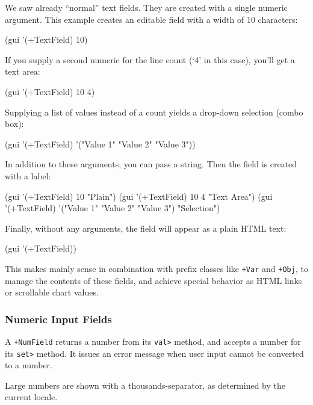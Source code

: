 We saw already ``normal'' text fields. They are created with a single
numeric argument. This example creates an editable field with a width of
10 characters:


\begin{wideverbatim}
(gui '(+TextField) 10)
\end{wideverbatim}

If you supply a second numeric for the line count (`4' in this case),
you'll get a text area:


\begin{wideverbatim}
(gui '(+TextField) 10 4)
\end{wideverbatim}

Supplying a list of values instead of a count yields a drop-down
selection (combo box):


\begin{wideverbatim}
(gui '(+TextField) '("Value 1" "Value 2" "Value 3"))
\end{wideverbatim}

In addition to these arguments, you can pass a string. Then the field is
created with a label:


\begin{wideverbatim}
(gui '(+TextField) 10 "Plain")
(gui '(+TextField) 10 4 "Text Area")
(gui '(+TextField) '("Value 1" "Value 2" "Value 3") "Selection")
\end{wideverbatim}

Finally, without any arguments, the field will appear as a plain HTML
text:


\begin{wideverbatim}
(gui '(+TextField))
\end{wideverbatim}

This makes mainly sense in combination with prefix classes like \texttt{+Var}
and \texttt{+Obj}, to manage the contents of these fields, and achieve special
behavior as HTML links or scrollable chart values.

\subsubsection{ Numeric Input Fields}
\label{sec:appl-devel-numeric-input-fields}%

A \texttt{+NumField} returns a number from its \texttt{val>} method, and accepts a
number for its \texttt{set>} method. It issues an error message when user input
cannot be converted to a number.

Large numbers are shown with a thousands-separator, as determined by the
current locale.


